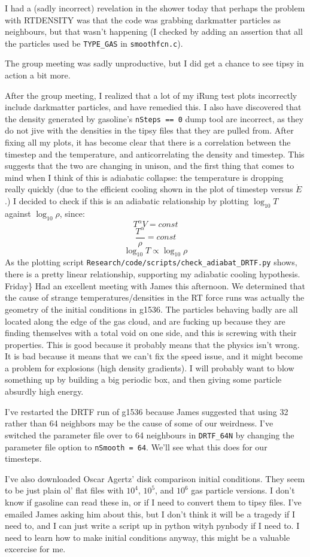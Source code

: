 \documentclass[11pt,letterpaper]{article}
\begin{document}
I had a (sadly incorrect) revelation in the shower today that perhaps
the problem with RTDENSITY was that the code was grabbing darkmatter
particles as neighbours, but that wasn't happening (I checked by adding
an assertion that all the particles used be \texttt{TYPE\_GAS} in
\texttt{smoothfcn.c}).

The group meeting was sadly unproductive, but I did get a chance to see
tipsy in action a bit more.

After the group meeting, I realized that a lot of my iRung test plots
incorrectly include darkmatter particles, and have remedied this. I also
have discovered that the density generated by gasoline's
\texttt{nSteps == 0} dump tool are incorrect, as they do not jive with
the densities in the tipsy files that they are pulled from. After fixing
all my plots, it has become clear that there is a correlation between
the timestep and the temperature, and anticorrelating the density and
timestep. This suggests that the two are changing in unison, and the
first thing that comes to mind when I think of this is adiabatic
collapse: the temperature is dropping really quickly (due to the
efficient cooling shown in the plot of timestep versus $\dot E$.) I
decided to check if this is an adiabatic relationship by plotting
$\log_{10} T$ against $\log_{10} \rho$, since: \[T^\alpha V = const\]
\[\frac{T^\alpha}{\rho} = const \] \[\log_{10} T \propto \log_{10}\rho\]
As the plotting script
\texttt{Research/code/scripts/check\_adiabat\_DRTF.py} shows, there is a
pretty linear relationship, supporting my adiabatic cooling hypothesis.
Friday\} Had an excellent meeting with James this afternoon. We
determined that the cause of strange temperatures/densities in the RT
force runs was actually the geometry of the initial conditions in g1536.
The particles behaving badly are all located along the edge of the gas
cloud, and are fucking up because they are finding themselves with a
total void on one side, and this is screwing with their properties. This
is good because it probably means that the physics isn't wrong. It is
bad because it means that we can't fix the speed issue, and it might
become a problem for explosions (high density gradients). I will
probably want to blow something up by building a big periodic box, and
then giving some particle absurdly high energy.

I've restarted the DRTF run of g1536 because James suggested that using
32 rather than 64 neighbors may be the cause of some of our weirdness.
I've switched the parameter file over to 64 neighbours in
\texttt{DRTF\_64N} by changing the parameter file option to
\texttt{nSmooth = 64}. We'll see what this does for our timesteps.

I've also downloaded Oscar Agertz' disk comparison initial conditions.
They seem to be just plain ol' flat files with $10^4$, $10^5$, and
$10^6$ gas particle versions. I don't know if gasoline can read these
in, or if I need to convert them to tipsy files. I've emailed James
asking him about this, but I don't think it will be a tragedy if I need
to, and I can just write a script up in python wityh pynbody if I need
to. I need to learn how to make initial conditions anyway, this might be
a valuable excercise for me.
\end{document}
